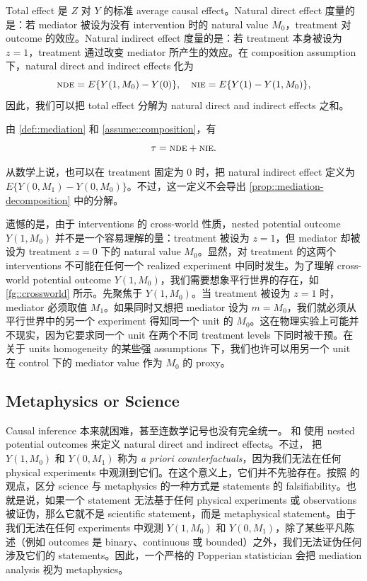 Total effect 是 $Z$ 对 $Y$ 的标准 average causal effect。Natural direct effect 度量的是：若 mediator 被设为没有 intervention 时的 natural value $M_0$，treatment 对 outcome 的效应。Natural indirect effect 度量的是：若 treatment 本身被设为 $z=1$，treatment 通过改变 mediator 所产生的效应。在 composition assumption 下，natural direct and indirect effects 化为
$$
\textsc{nde} = E\{  Y(1,M_0) - Y(0)  \} ,\quad
\textsc{nie} = E\{  Y(1) - Y(1, M_0) \},
$$
因此，我们可以把 total effect 分解为 natural direct and indirect effects 之和。


\begin{proposition}
\label{prop::mediation-decomposition}
由 \cref{def::mediation} 和 \cref{assume::composition}，有
$$
\tau = \textsc{nde} + \textsc{nie} .
$$
\end{proposition}

从数学上说，也可以在 treatment 固定为 $0$ 时，把 natural indirect effect 定义为 $ E\{Y(0,M_1)-Y(0,M_0)\}$。不过，这一定义不会导出 \cref{prop::mediation-decomposition} 中的分解。

遗憾的是，由于 interventions 的 cross-world 性质，nested potential outcome $Y(1,M_0)$ 并不是一个容易理解的量：treatment 被设为 $z=1$，但 mediator 却被设为 treatment $z=0$ 下的 natural value $M_0$。显然，对 treatment 的这两个 interventions 不可能在任何一个 realized experiment 中同时发生。为了理解 cross-world potential outcome $Y(1,M_0)$，我们需要想象平行世界的存在，如 \cref{fg::crossworld} 所示。先聚焦于 $Y(1,M_0)$。当 treatment 被设为 $z=1$ 时，mediator 必须取值 $M_1$。如果同时又想把 mediator 设为 $m=M_0$，我们就必须从平行世界中的另一个 experiment 得知同一个 unit 的 $M_0$。这在物理实验上可能并不现实，因为它要求同一个 unit 在两个不同 treatment levels 下同时被干预。在关于 units homogeneity 的某些强 assumptions 下，我们也许可以用另一个 unit 在 control 下的 mediator value 作为 $M_0$ 的 proxy。



 
\subsection{Metaphysics or Science}
\label{sec::popper-science}

Causal inference 本来就困难，甚至连数学记号也没有完全统一。\citet{Robins::1992} 和 \citet{Pearl::2001} 使用 nested potential outcomes 来定义 natural direct and indirect effects。不过，\citet{frangakis2002principal} 把 $Y(1,M_0)$ 和 $Y(0,M_1)$ 称为 {\it a priori counterfactuals}，因为我们无法在任何 physical experiments 中观测到它们。在这个意义上，它们并不先验存在。按照 \citet{popper1963conjectures} 的观点，区分 science 与 metaphysics 的一种方式是 statements 的 falsifiability。也就是说，如果一个 statement 无法基于任何 physical experiments 或 observations 被证伪，那么它就不是 scientific statement，而是 metaphysical statement。由于我们无法在任何 experiments 中观测 $Y(1,M_0)$ 和 $Y(0,M_1)$，除了某些平凡陈述（例如 outcomes 是 binary、continuous 或 bounded）之外，我们无法证伪任何涉及它们的 statements。因此，一个严格的 Popperian statistician 会把 mediation analysis 视为 metaphysics。


